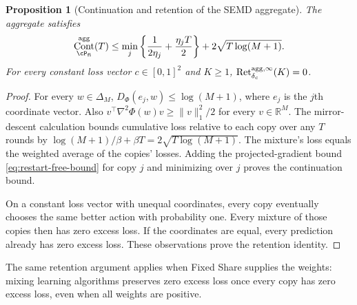 \documentclass[11pt,twoside]{article}
\newcommand{\R}{\mathbb R}
\newtheorem{proposition}[theorem]{Proposition}
\theoremstyle{definition}
\theoremstyle{remark}
\DeclareMathOperator{\Cont}{Cont}
\DeclareMathOperator{\Ret}{Ret}
\begin{document}
\begin{proposition}[Continuation and retention of the SEMD aggregate]
The aggregate satisfies
\[
 \Cont_{\cP_{\rm fi}}^{\rm agg}(T)
 \le\min_j\left\{\frac1{2\eta_j}+\frac{\eta_jT}{2}\right\}
       +2\sqrt{T\log(M+1)}.
\]
For every constant loss vector $c\in[0,1]^2$ and $K\ge1$,
$\Ret_{\delta_c}^{{\rm agg},\infty}(K)=0$.
\end{proposition}
\begin{proof}
For every $w\in\Delta_M$, $D_\Phi(e_j,w)\le\log(M+1)$, where $e_j$
is the $j$th coordinate vector. Also
$v^\top\nabla^2\Phi(w)v\ge\|v\|_1^2/2$ for every $v\in\R^M$.
The mirror-descent calculation bounds cumulative loss relative to each
copy over any $T$ rounds by
$\log(M+1)/\beta+\beta T=2\sqrt{T\log(M+1)}$.
The mixture's loss equals the weighted average of the copies' losses.
Adding the projected-gradient bound \cref{eq:restart-free-bound} for
copy $j$ and minimizing over $j$ proves the continuation bound.

On a constant loss vector with unequal coordinates, every copy eventually
chooses the same better action with probability one. Every mixture of
those copies then has zero excess loss. If the coordinates are equal,
every prediction already has zero excess loss. These observations prove
the retention identity.
\end{proof}

The same retention argument applies when Fixed Share supplies the weights:
mixing learning algorithms preserves zero excess loss once every copy has
zero excess loss, even when all weights are positive.
\end{document}
